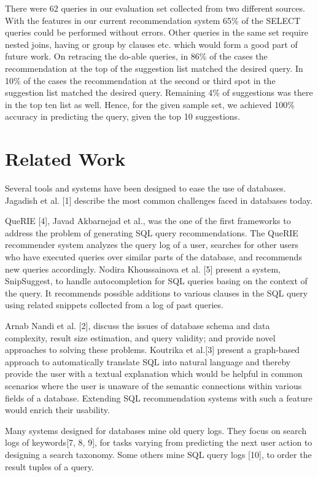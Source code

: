 \documentclass{acm_proc_article-sp}
\begin{document}
There were 62 queries in our evaluation set collected from two different sources. With the features in our current recommendation system 65\% of the SELECT queries could be performed without errors. Other queries in the same set require nested joins, having or group by clauses etc. which would form a good part of future work. On retracing the do-able queries, in 86\% of the cases the recommendation at the top of the suggestion list matched the desired query. In 10\% of the cases the recommendation at the second or third spot in the suggestion list matched the desired query. Remaining 4\% of suggestions was there in the top ten list as well. Hence, for the given sample set, we achieved 100\% accuracy in predicting the query, given the top 10 suggestions.

\section{Related Work}
Several tools and systems have been designed to ease the use of databases. Jagadish et al. [1] describe the most common challenges faced in databases today.

QueRIE [4], Javad Akbarnejad et al., was the one of the first frameworks to address the problem of generating SQL query recommendations. The QueRIE recommender system analyzes the query log of a user, searches for other users who have executed queries over similar parts of the database, and recommends new queries accordingly. 
Nodira Khoussainova et al. [5] present a system, SnipSuggest, to handle autocompletion for SQL queries basing on the context of the query.  It recommends possible additions to various clauses in the SQL query using related snippets collected from a log of past queries. 

Arnab Nandi et al. [2], discuss the issues of database schema and data complexity, result size estimation, and query validity; and provide novel approaches to solving these problems. Koutrika et al.[3] present a graph-based approach to automatically translate SQL into natural language and thereby provide the user with a textual explanation which would be helpful in common scenarios where the user is unaware of the semantic connections within various fields of a database. Extending SQL recommendation systems with such a feature would enrich their usability.

Many systems designed for databases mine old query logs. They focus on search logs of keywords[7, 8, 9], for tasks varying from predicting the next user action to designing a search taxonomy. Some others mine SQL query logs [10], to order the result tuples of a query. 
\end{document}
